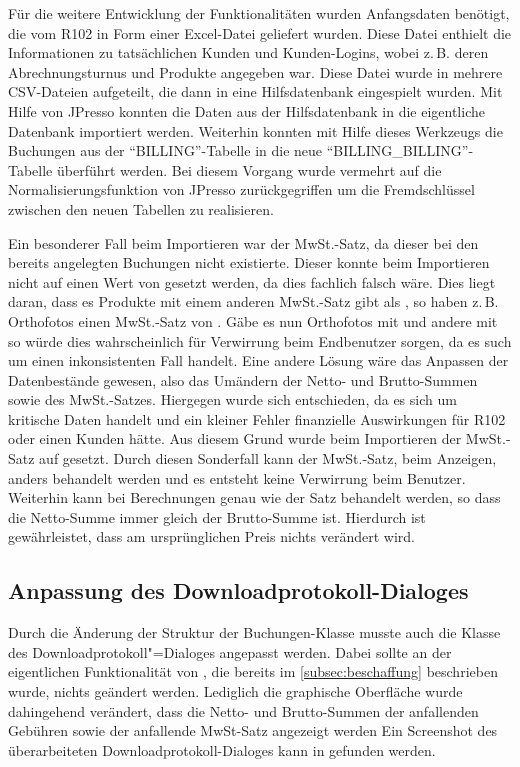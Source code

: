 Für die weitere Entwicklung der Funktionalitäten wurden Anfangsdaten benötigt, die vom R102 in Form einer Excel-Datei geliefert wurden.
Diese Datei enthielt die Informationen zu tatsächlichen Kunden und Kunden-Logins, wobei z.\,B. deren Abrechnungsturnus und Produkte angegeben war.
Diese Datei wurde in mehrere \acs{CSV}-Dateien aufgeteilt, die dann in eine Hilfsdatenbank eingespielt wurden.
Mit Hilfe von JPresso konnten die Daten aus der Hilfsdatenbank in die eigentliche Datenbank importiert werden.
Weiterhin konnten mit Hilfe dieses Werkzeugs die Buchungen aus der "`BILLING"'-Tabelle in die neue "`BILLING\_BILLING"'-Tabelle überführt werden.
Bei diesem Vorgang wurde vermehrt auf die Normalisierungsfunktion von JPresso zurückgegriffen um die Fremdschlüssel zwischen den neuen Tabellen zu realisieren.

Ein besonderer Fall beim Importieren war der MwSt.-Satz, da dieser bei den bereits angelegten Buchungen nicht existierte.
Dieser konnte beim Importieren nicht auf einen Wert von  gesetzt werden, da dies fachlich falsch wäre.
Dies liegt daran, dass es Produkte mit einem anderen MwSt.-Satz gibt als , so haben z.\,B. Orthofotos einen MwSt.-Satz von .
Gäbe es nun Orthofotos mit  und andere mit  so würde dies wahrscheinlich für Verwirrung beim Endbenutzer sorgen, da es such um einen inkonsistenten Fall handelt.
Eine andere Lösung wäre das Anpassen der Datenbestände gewesen, also das Umändern der Netto- und Brutto-Summen sowie des MwSt.-Satzes. 
Hiergegen wurde sich entschieden, da es sich um kritische Daten handelt und ein kleiner Fehler finanzielle Auswirkungen für R102 oder einen Kunden hätte.
Aus diesem Grund wurde beim Importieren der MwSt.-Satz auf  gesetzt.
Durch diesen Sonderfall kann der MwSt.-Satz, beim Anzeigen, anders behandelt werden und es entsteht keine Verwirrung beim Benutzer.
Weiterhin kann bei Berechnungen  genau wie der Satz  behandelt werden, so dass die Netto-Summe immer gleich der Brutto-Summe ist.
Hierdurch ist gewährleistet, dass am ursprünglichen Preis nichts verändert wird.


\subsection{Anpassung des Downloadprotokoll-Dialoges}
Durch die Änderung der Struktur der Buchungen-Klasse musste auch die Klasse des Downloadprotokoll"=Dialoges  angepasst werden.
Dabei sollte an der eigentlichen Funktionalität von , die bereits im \autoref{subsec:beschaffung} beschrieben wurde, nichts geändert werden.
Lediglich die graphische Oberfläche wurde dahingehend verändert, dass die Netto- und Brutto-Summen der anfallenden Gebühren sowie der anfallende MwSt-Satz angezeigt werden
Ein Screenshot des überarbeiteten Downloadprotokoll-Dialoges kann in  gefunden werden.

